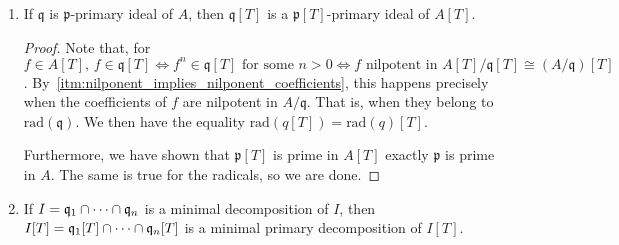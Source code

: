 \begin{problem}
\begin{enumerate}[label=(\theproblem.\arabic*),ref=\theproblem.\arabic*]
\begin{sol}
\begin{proof}
                Now, let $\mathfrak{p}$ be a minimal prime of $I$.
                $\mathfrak{p}[T]$ must contain a minimal prime of $I[T]$, say, $\mathfrak{p}'[T]$
                Then, we take the contraction $I \subseteq \mathfrak{p}' \subseteq \mathfrak{p}$
                and by definition of $\mathfrak{p}$ being a minimal of $I$,
                we conclude that $\mathfrak{p}' = \mathfrak{p}$ and $\mathfrak{p}'[T] = \mathfrak{p}[T]$.
                Thus, $\mathfrak{p}[T]$ is a minimal prime of $I[T]$.

            \end{proof}
        \end{sol}

        \item If $\mathfrak{q}$ is $\mathfrak{p}$-primary ideal of $A$, then $\mathfrak{q}[T]$ is a $\mathfrak{p}[T]$-primary ideal of $A[T]$.
        \begin{sol}

            \begin{proof}

            Note that, for $ f \in A[T], \, f \in \mathfrak{q}[T] \Leftrightarrow f^n \in \mathfrak{q}[T] \text{ for some } n > 0
            \Leftrightarrow f \text{ nilpotent in } A[T] / \mathfrak{q}[T] \cong (A/\mathfrak{q})[T]$.
            By~\ref{itm:nilponent_implies_nilponent_coefficients}, this happens precisely when
            the coefficients of $f$ are nilpotent in $A/\mathfrak{q}$.
            That is, when they belong to $\text{rad}(\mathfrak{q})$.
            We then have the equality $\text{rad}(q[T]) = \text{rad}(q)[T]$.

            Furthermore, we have shown that $\mathfrak{p}[T]$ is prime in $A[T]$ exactly $\mathfrak{p}$ is prime in $A$.
            The same is true for the radicals, so we are done.
            \end{proof}


        \end{sol}

        \item If $I = \mathfrak{q}_1 \cap \cdots \cap \mathfrak{q}_n$ is a minimal decomposition of $I$, then $I[T] = \mathfrak{q}_1[T] \cap \cdots \cap \mathfrak{q}_n[T]$ is a minimal primary decomposition of $I[T]$.
        \begin{sol}
        \end{sol}

    \end{enumerate}
\end{problem}